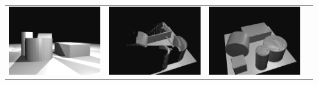 \begin{tabular}{cccc}
\includegraphics[height=\turnheight]{umk4nke6pzebef2b_SEQ_input.png} &
\includegraphics[height=\turnheight]{umk4nke6pzebef2b_SEQ_visible.png} &
\includegraphics[height=\turnheight]{umk4nke6pzebef2b_SEQ_gt.png} &

\end{tabular}
